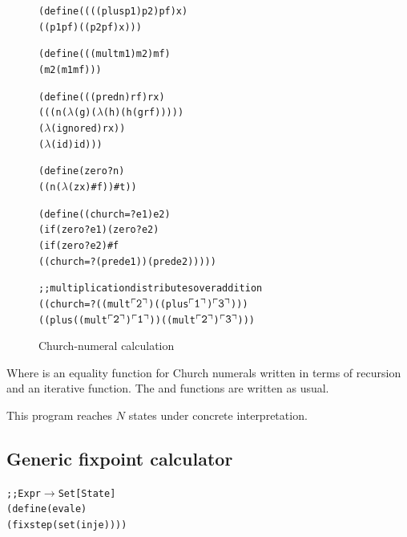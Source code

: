\documentclass[preprint,onecolumn,9pt]{sigplanconf} %
\begin{document}
\newcommand{\church}[1]{\(\ulcorner{\tt #1}\urcorner\)}





\begin{figure}
\begin{alltt}
(define ((((plus p1) p2) pf) x)
  ((p1 pf) ((p2 pf) x)))

(define (((mult m1) m2) mf)
  (m2 (m1 mf)))

(define (((pred n) rf) rx)
  (((n (\(\lambda\) (g) (\(\lambda\) (h) (h (g rf)))))
    (\(\lambda\) (ignored) rx))
   (\(\lambda\) (id) id)))

(define (zero? n)
  ((n (\(\lambda\) (zx) #f)) #t))

(define ((church=? e1) e2)
  (if (zero? e1) (zero? e2)
      (if (zero? e2) #f
          ((church=? (pred e1)) (pred e2)))))

;; multiplication distributes over addition
((church=? ((mult \church2) ((plus \church1) \church3)))
 ((plus ((mult \church2) \church1)) ((mult \church2) \church3)))
\end{alltt}
\caption{Church-numeral calculation}
\end{figure}

Where  is an equality function for Church numerals
written in terms of recursion and an iterative  function.
The  and  functions are written as usual.

This program reaches $N$ states under concrete interpretation.

\newpage
\subsection{Generic fixpoint calculator}

\begin{alltt}
;; Expr \(\to\) Set[State]
(define (eval e)
  (fix step (set (inj e))))
\end{alltt}
\end{document}
